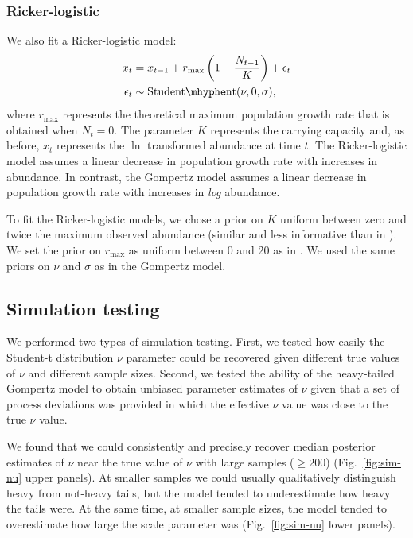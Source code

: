 \subsubsection{Ricker-logistic} We also fit a Ricker-logistic model:
\begin{align}
x_t &= x_{t-1} + r_{\mathrm{max}}\left(1 - \frac{N_{t-1}}{K}\right) + \epsilon_t\\
\epsilon_t &\sim \mathrm{Student\mhyphen t}(\nu, 0, \sigma),
\end{align}
where \(r_\mathrm{max}\) represents the theoretical maximum population growth
rate that is obtained when \(N_t = 0\). The parameter \(K\) represents the
carrying capacity and, as before, \(x_t\) represents the \(\ln\) transformed
abundance at time \(t\). The Ricker-logistic model assumes a linear decrease in
population growth rate with increases in abundance. In contrast, the Gompertz
model assumes a linear decrease in population growth rate with increases in
\textit{log} abundance.

To fit the Ricker-logistic models, we chose a prior on \(K\) uniform between
zero and twice the maximum observed abundance (similar and less informative
than in \citet{delean2013}). We set the prior on
\(r_\mathrm{max}\) as uniform between 0 and 20 as in \citet{delean2013}. We used the same priors on \(\nu\) and \(\sigma\) as in
the Gompertz model.

\subsection{Simulation testing}
We performed two types of simulation testing.
First, we tested how easily the Student-t distribution \(\nu\) parameter could
be recovered given different true values of \(\nu\) and different sample sizes.
Second, we tested the ability of the heavy-tailed Gompertz model to obtain
unbiased parameter estimates of \(\nu\) given that a set of process deviations
was provided in which the effective \(\nu\) value was close to the true \(\nu\)
value.

We found that we could consistently and precisely recover median posterior
estimates of \(\nu\) near the true value of \(\nu\) with large samples (\(\ge
200\)) (Fig.~\ref{fig:sim-nu} upper panels). At smaller samples we could
usually qualitatively distinguish heavy from not-heavy tails, but the model
tended to underestimate how heavy the tails were. At the same time, at smaller
sample sizes, the model tended to overestimate how large the scale parameter
was (Fig.~\ref{fig:sim-nu} lower panels).

